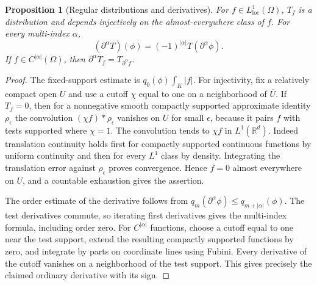 \documentclass[11pt,oneside,openany]{book}
\newtheorem{proposition}[theorem]{Proposition}
\theoremstyle{definition}
\theoremstyle{remark}
\begin{document}
\begin{proposition}[Regular distributions and derivatives]
\label{p102:AN-11-C02-R01}
For \(f\in L^1_{\mathrm{loc}}(\Omega)\), \(T_f\) is a distribution and depends injectively on the almost-everywhere class of \(f\). For every multi-index \(\alpha\),
\[
 (\partial^\alpha T)(\phi)=(-1)^{|\alpha|}T(\partial^\alpha\phi).
\]
If \(f\in C^{|\alpha|}(\Omega)\), then \(\partial^\alpha T_f=T_{\partial^\alpha f}\).
\end{proposition}
\begin{proof}
The fixed-support estimate is \(q_0(\phi)\int_K|f|\). For injectivity, fix a relatively compact open \(U\) and use a cutoff \(\chi\) equal to one on a neighborhood of \(\overline U\). If \(T_f=0\), then for a nonnegative smooth compactly supported approximate identity \(\rho_\epsilon\) the convolution \((\chi f)*\rho_\epsilon\) vanishes on \(U\) for small \(\epsilon\), because it pairs \(f\) with tests supported where \(\chi=1\). The convolution tends to \(\chi f\) in \(L^1(\mathbb R^d)\). Indeed translation continuity holds first for compactly supported continuous functions by uniform continuity and then for every \(L^1\) class by density. Integrating the translation error against \(\rho_\epsilon\) proves convergence. Hence \(f=0\) almost everywhere on \(U\), and a countable exhaustion gives the assertion.

The order estimate of the derivative follows from \(q_m(\partial^\alpha\phi)\leq q_{m+|\alpha|}(\phi)\). The test derivatives commute, so iterating first derivatives gives the multi-index formula, including order zero. For \(C^{|\alpha|}\) functions, choose a cutoff equal to one near the test support, extend the resulting compactly supported functions by zero, and integrate by parts on coordinate lines using Fubini. Every derivative of the cutoff vanishes on a neighborhood of the test support. This gives precisely the claimed ordinary derivative with its sign.
\end{proof}
\end{document}
